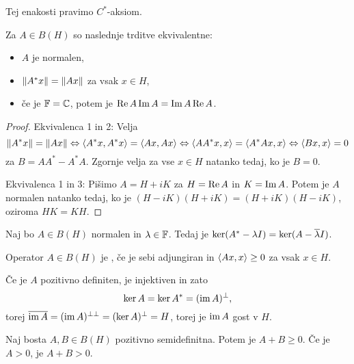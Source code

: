 \begin{opomba}
  Tej enakosti pravimo $C^*$-aksiom.
\end{opomba}


\begin{trditev}
  Za $A \in B(H)$ so naslednje trditve ekvivalentne:
  \begin{itemize}
  \item $A$ je normalen,
  \item $\left\lVert A^* x\right\rVert = \left\lVert Ax\right\rVert$ za vsak $x \in H$,
  \item če je $\mathbb{F} = \mathbb{C}$, potem je $\operatorname{Re} A \operatorname{Im} A = \operatorname{Im} A \operatorname{Re} A$.
  \end{itemize}
\end{trditev}

\begin{proof}
  Ekvivalenca 1 in 2:
  Velja
  \[
	\left\lVert A^* x\right\rVert = \left\lVert A x\right\rVert
	\Leftrightarrow \left< A^*x, A^* x \right> = \left< Ax, Ax \right>
	\Leftrightarrow \left< A A^* x, x \right> = \left< A^* A x, x \right>
	\Leftrightarrow \left< B x, x \right> = 0
  \]
  za $B = A A^* - A^* A$.
  Zgornje velja za vse $x \in H$ natanko tedaj, ko je $B = 0$.

  Ekvivalenca 1 in 3:
  Pišimo $A = H + iK$ za $H = \operatorname{Re} A$ in $K = \operatorname{Im} A$.
  Potem je $A$ normalen natanko tedaj, ko je $(H - i K)(H + iK) = (H + iK)(H -
  iK)$, oziroma $HK = KH$.
\end{proof}


\begin{posledica}
  Naj bo $A \in B(H)$ normalen in $\lambda \in \mathbb{F}$.
  Tedaj je $\operatorname{ker} (A^* - \lambda I) = \operatorname{ker} (A - \overline{\lambda} I)$.
\end{posledica}

\begin{definicija}
  Operator $A \in B(H)$ je , če je sebi
  adjungiran in $\left< Ax,x \right> \ge 0$ za vsak $x \in H$.
\end{definicija}

\begin{opomba}
  Če je $A$ pozitivno definiten, je injektiven in zato
  \[
	\operatorname{ker} A = \operatorname{ker} A^* = (\operatorname{im} A)^\bot,
  \]
  torej $\overline{\operatorname{im} A} = (\operatorname{im} A)^{\bot \bot} = (\operatorname{ker} A)^\bot = H$,
  torej je $\operatorname{im} A$ gost v $H$.
\end{opomba}

\begin{lema}
  Naj bosta $A, B \in B(H)$ pozitivno semidefinitna.
  Potem je $A+B \ge 0$.
  Če je $A > 0$, je $A+B > 0$.
\end{lema}

